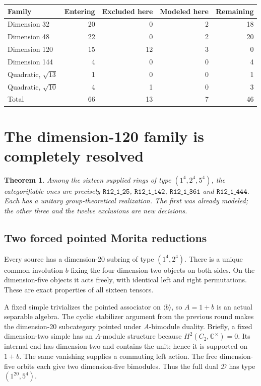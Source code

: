\documentclass[11pt]{article}
\newtheorem{theorem}{Theorem}
\newcommand{\R}[1]{\texttt{R12\_1\_#1}}
\newcommand{\C}{\mathbb C}
\begin{document}
\begin{center}
\begin{tabular}{lrrrr}
\toprule
Family & Entering & Excluded here & Modeled here & Remaining\\
\midrule
Dimension 32 &20&0&2&18\\
Dimension 48 &22&0&2&20\\
Dimension 120 &15&12&3&0\\
Dimension 144 &4&0&0&4\\
Quadratic, $\sqrt{13}$ &1&0&0&1\\
Quadratic, $\sqrt{10}$ &4&1&0&3\\
\midrule
Total &66&13&7&46\\
\bottomrule
\end{tabular}
\end{center}

\section{The dimension-120 family is completely resolved}
\begin{theorem}
Among the sixteen supplied rings of type $(1^4,2^4,5^4)$, the categorifiable
ones are precisely $\R{25}$, $\R{142}$, $\R{361}$ and $\R{444}$.
Each has a unitary group-theoretical realization. The first was already
modeled; the other three and the twelve exclusions are new decisions.
\end{theorem}

\subsection{Two forced pointed Morita reductions}
Every source has a dimension-20 subring of type $(1^4,2^4)$. There is a
unique common involution $b$ fixing the four dimension-two objects on both
sides. On the dimension-five objects it acts freely, with identical left
and right permutations. These are exact properties of all sixteen tensors.

A fixed simple trivializes the pointed associator on $\langle b\rangle$,
so $A=1+b$ is an actual separable algebra. The cyclic stabilizer argument
from the previous round makes the dimension-20 subcategory pointed under
$A$-bimodule duality. Briefly, a fixed dimension-two simple has an $A$-module
structure because $H^2(C_2,\C^\times)=0$. Its internal end has dimension two
and contains the unit; hence it is supported on $1+b$. The same vanishing
supplies a commuting left action. The free dimension-five orbits each
give two dimension-five bimodules. Thus the full dual $\mathcal D$ has type
$(1^{20},5^4)$.
\end{document}
